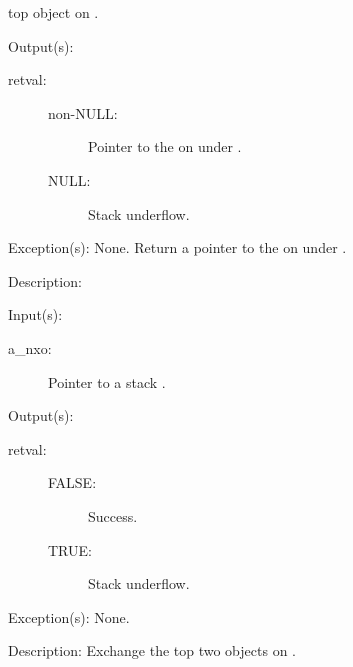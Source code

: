 \begin{capi}
\begin{capilist}
\begin{description}
			top object on .
		\end{description}
	\item[Output(s): ]
		\begin{description}\item[]
		\item[retval: ]
			\begin{description}\item[]
			\item[non-NULL: ]
				Pointer to the  on  under
				.
			\item[NULL: ]
				Stack underflow.
			\end{description}
		\end{description}
	\item[Exception(s): ] None.
		Return a pointer to the  on  under
		.
	\item[Description: ]
	\end{capilist}
\label{nxo_stack_exch}
	\begin{capilist}
	\item[Input(s): ]
		\begin{description}\item[]
		\item[a\_nxo: ]
			Pointer to a stack .
		\end{description}
	\item[Output(s): ]
		\begin{description}\item[]
		\item[retval: ]
			\begin{description}\item[]
			\item[FALSE: ]
				Success.
			\item[TRUE: ]
				Stack underflow.
			\end{description}
		\end{description}
	\item[Exception(s): ] None.
	\item[Description: ]
		Exchange the top two objects on .
	\end{capilist}
\label{nxo_stack_rool}
	\begin{capilist}

\end{capilist}
\end{capi}
